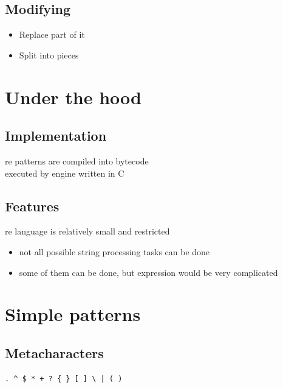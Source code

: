 \documentclass{beamer}
\begin{document}
\subsection{Modifying}
\begin{frame}
\begin{itemize}
\item Replace part of it
\item Split into pieces
\end{itemize}
\end{frame}

\section{Under the hood}
\subsection{Implementation}
\begin{frame}
re patterns are compiled into bytecode \\
\pause
executed by engine written in C
\end{frame}

\subsection{Features}
\begin{frame}
re language is relatively small and restricted
\pause
 \begin{itemize}
  \item not all possible string processing tasks can be done
  \item some of them can be done, but expression would be very complicated
 \end{itemize}
\end{frame}

\section{Simple patterns}
\subsection{Metacharacters}
\begin{frame}[fragile]
\begin{verbatim}
. ^ $ * + ? { } [ ] \ | ( )
\end{verbatim}
\end{frame}
\end{document}
